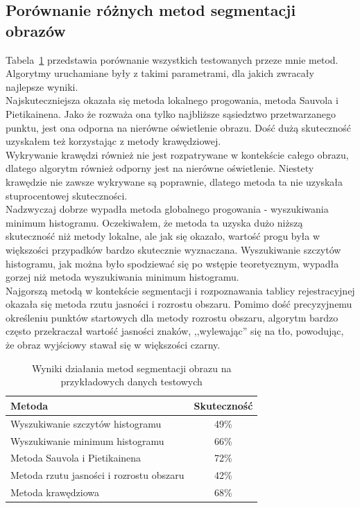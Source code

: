 \subsection{Porównanie różnych metod segmentacji obrazów}
Tabela~\ref{tab:all_methods_comparision} przedstawia porównanie wszystkich testowanych przeze mnie metod. Algorytmy uruchamiane były z takimi parametrami, dla jakich zwracały najlepsze wyniki. \\
Najskuteczniejsza okazała się metoda lokalnego progowania, metoda Sauvola i Pietikainena. Jako że rozważa ona tylko najbliższe sąsiedztwo przetwarzanego punktu, jest ona odporna na nierówne oświetlenie obrazu. Dość dużą skuteczność uzyskałem też korzystając z metody krawędziowej. \\
Wykrywanie krawędzi również nie jest rozpatrywane w kontekście całego obrazu, dlatego algorytm również odporny jest na nierówne oświetlenie. Niestety krawędzie nie zawsze wykrywane są poprawnie, dlatego metoda ta nie uzyskała stuprocentowej skuteczności. \\
Nadzwyczaj dobrze wypadła metoda globalnego progowania - wyszukiwania minimum histogramu. Oczekiwałem, że metoda ta uzyska dużo niższą skuteczność niż metody lokalne, ale jak się okazało, wartość progu była w większości przypadków bardzo skutecznie wyznaczana. Wyszukiwanie szczytów histogramu, jak można było spodziewać się po wstępie teoretycznym, wypadła gorzej niż metoda wyszukiwania minimum histogramu. \\
Najgorszą metodą w kontekście segmentacji i rozpoznawania tablicy rejestracyjnej okazała się metoda rzutu jasności i rozrostu obszaru. Pomimo dość precyzyjnemu określeniu punktów startowych dla metody rozrostu obszaru, algorytm bardzo często przekraczał wartość jasności znaków, ,,wylewając'' się na tło, powodując, że obraz wyjściowy stawał się w większości czarny.

\begin {table}
  \begin{center}
    \begin{tabular}{l | c}
      Metoda & Skuteczność \\
      \hline
      Wyszukiwanie szczytów histogramu & 49\% \\
      Wyszukiwanie minimum histogramu & 66\% \\
      Metoda Sauvola i Pietikainena & 72\% \\
      Metoda rzutu jasności i rozrostu obszaru & 42\% \\
      Metoda krawędziowa & 68\%
    \end{tabular}
    \caption {Wyniki działania metod segmentacji obrazu na przykładowych danych testowych}
    \label{tab:all_methods_comparision} 
  \end{center}
\end {table}

